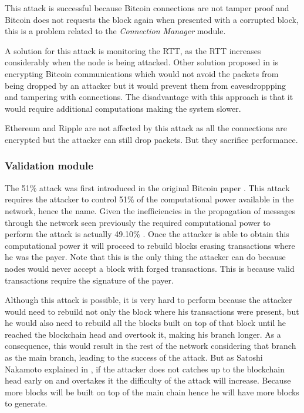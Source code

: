 This attack is successful because Bitcoin connections are not tamper proof and Bitcoin does not requests the block again when presented with a corrupted block, this is a problem related to the \textit{Connection Manager} module.

A solution for this attack is monitoring the RTT, as the RTT increases considerably when the node is being attacked. Other solution proposed in \cite{apostolaki2016hijacking} is encrypting Bitcoin communications which would not avoid the packets from being dropped by an attacker but it would prevent them from eavesdroppping and tampering with connections. The disadvantage with this approach is that it would require additional computations making the system slower.

Ethereum and Ripple are not affected by this attack as all the connections are encrypted but the attacker can still drop packets. But they sacrifice performance.


\subsubsection{Validation module}
\label{sec:validation_module}

\label{sec:51attack}
The 51\% attack was first introduced in the original Bitcoin paper \cite{nakamoto2008bitcoin}. This attack requires the attacker to control 51\% of the computational power available in the network, hence the name. Given the inefficiencies in the propagation of messages through the network seen previously the required computational power to perform the attack is actually 49.10\% \cite{decker2013information}. Once the attacker is able to obtain this computational power it will proceed to rebuild blocks erasing transactions where he was the payer. Note that this is the only thing the attacker can do because nodes would never accept a block with forged transactions. This is because valid transactions require the signature of the payer.

Although this attack is possible, it is very hard to perform because the attacker would need to rebuild not only the block where his transactions were present, but he would also need to rebuild all the blocks built on top of that block until he reached the blockchain head and overtook it, making his branch longer. As a consequence, this would result in the rest of the network considering that branch as the main branch, leading to the success of the attack. But as Satoshi Nakamoto explained in \cite{nakamoto2008bitcoin}, if the attacker does not catches up to the blockchain head early on and overtakes it the difficulty of the attack will increase. Because more blocks will be built on top of the main chain hence he will have more blocks to generate.

